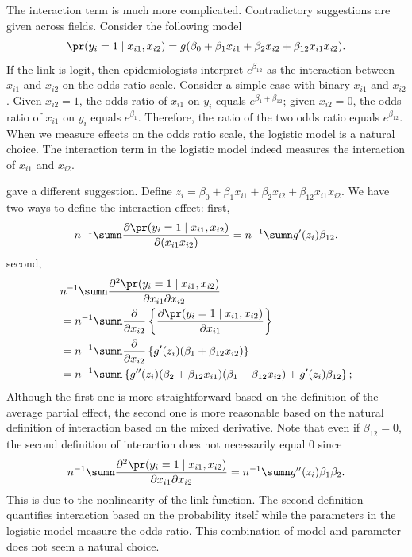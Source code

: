   
 
The interaction term is much more complicated. Contradictory suggestions are given across fields. 
Consider
the following model
\[
\pr(y_{i}=1\mid x_{i1},x_{i2})=g(\beta_{0}+\beta_{1}x_{i1}+\beta_{2}x_{i2}+\beta_{12}x_{i1}x_{i2}).
\]
If the link is logit, then epidemiologists interpret $e^{\beta_{12}}$ as the interaction between $x_{i1}$ and $x_{i2}$ on the odds ratio scale. Consider a simple case with binary $x_{i1}$ and $x_{i2}$. Given $x_{i2} = 1$, the odds ratio of $x_{i1}$ on $y_i$ equals $e^{\beta_1 + \beta_{12}}$; given $x_{i2} = 0$, the odds ratio of $x_{i1}$ on $y_i$ equals $e^{\beta_1}$. Therefore, the ratio of the two odds ratio equals $e^{\beta_{12}}$.  When we measure effects on the odds ratio scale, the logistic model is a natural choice. The interaction term in the logistic model indeed measures the interaction of $x_{i1}$ and $x_{i2}$. 

\citet{ai2003interaction} gave a different suggestion. 
Define $z_i = \beta_{0}+\beta_{1}x_{i1}+\beta_{2}x_{i2}+\beta_{12}x_{i1}x_{i2}.$
We have two ways to define the interaction effect: first,
\[
n^{-1}\sumn\frac{\partial\pr(y_{i}=1\mid x_{i1},x_{i2})}{\partial(x_{i1}x_{i2})}
=n^{-1}\sumn g'(  z_i )\beta_{12}.
\]
second,
\begin{align*}
& n^{-1}\sumn\frac{\partial^{2}\pr(y_{i}=1\mid x_{i1},x_{i2})}{\partial x_{i1}\partial x_{i2}} \\
& =n^{-1}\sumn\frac{\partial}{\partial x_{i2}}\left\{ \frac{\partial\pr(y_{i}=1\mid x_{i1},x_{i2})}{\partial x_{i1}}\right\} \\
 & =n^{-1}\sumn\frac{\partial}{\partial x_{i2}}\left\{ g'(z_i)(\beta_{1}+\beta_{12}x_{i2})\right\} \\
 & =n^{-1}\sumn\left\{ g''( z_i )(\beta_{2}+\beta_{12}x_{i1})(\beta_{1}+\beta_{12}x_{i2})+g'(z_i)\beta_{12}\right\} ;
\end{align*}
Although the first one is more straightforward based on the definition of the average partial effect, the second one is more reasonable based on the natural definition of interaction based on the mixed derivative.  
Note that even if $\beta_{12} = 0$, the second definition of interaction 
does not necessarily equal 0 since
\begin{align*}
 n^{-1}\sumn\frac{\partial^{2}\pr(y_{i}=1\mid x_{i1},x_{i2})}{\partial x_{i1}\partial x_{i2}}  
 =n^{-1}\sumn   g''( z_i ) \beta_{1}  \beta_{2} . 
\end{align*}
 This is due to the nonlinearity of the link function. 
The second definition quantifies interaction based on the probability itself while the parameters in the logistic model measure the odds ratio. This combination of model and parameter does not seem a natural choice. 



